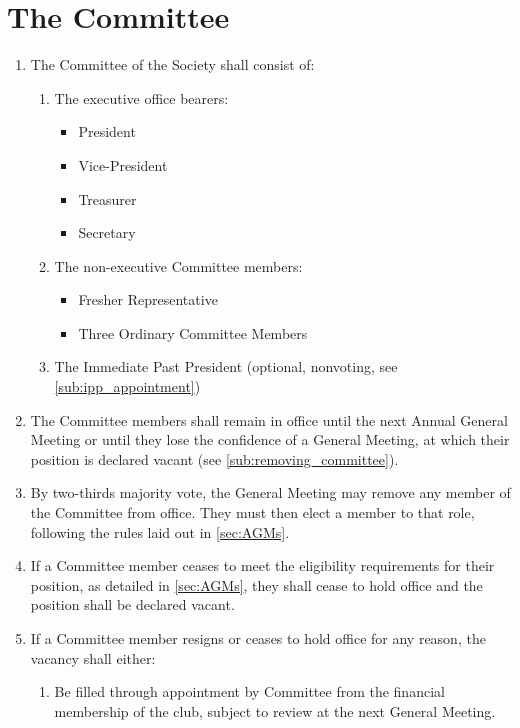 \documentclass[a4paper]{article}
\newenvironment{enumsection}[1]{\section{#1} \begin{enumerate}[ref=\thesection.\theenumi]}{\end{enumerate}}
\begin{document}
\begin{enumsection}{The Committee} \label{sec:committee}
    \item The Committee of the Society shall consist of:
    \begin{enumerate}
        \item The executive office bearers:
        \begin{itemize}
          \item President
          \item Vice-President
          \item Treasurer
          \item Secretary 
        \end{itemize}
        \item The non-executive Committee members:
        \begin{itemize}
            \item Fresher Representative
            \item Three Ordinary Committee Members
        \end{itemize}
        \item The Immediate Past President (optional, nonvoting, see \cref{sub:ipp_appointment})
    \end{enumerate}
    \item The Committee members shall remain in office until the next Annual General Meeting or until they lose the confidence of a General Meeting, at which their position is declared vacant (see \cref{sub:removing_committee}).
    \item \label{sub:removing_committee} By two-thirds majority vote, the General Meeting may remove any member of the Committee from office. They must then elect a member to that role, following the rules laid out in \cref{sec:AGMs}.
    \item If a Committee member ceases to meet the eligibility requirements for their position, as detailed in \cref{sec:AGMs}, they shall cease to hold office and the position shall be declared vacant.
    \item \label{sub:committee_resign} If a Committee member resigns or ceases to hold office for any reason, the vacancy shall either:
    \begin{enumerate}
        \item Be filled through appointment by Committee from the financial membership of the club, subject to review at the next General Meeting.
        \begin{enumerate}

\end{enumerate}
\end{enumerate}
\end{enumsection}
\end{document}
